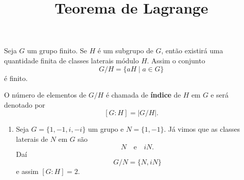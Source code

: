 \documentclass{beamer}
\title{Teorema de Lagrange}
\author[\autor]{\autor}
\institute[\instituto]{\instituto}
\date{}
\begin{document}
    \begin{frame}
        \maketitle
    \end{frame}


    \begin{frame}
        Seja $G$ um grupo finito. Se $H$ é um subgrupo de $G$, então existirá uma quantidade finita de classes laterais módulo $H$.
        Assim o conjunto
        \[
            G/H = \{aH \mid a \in G\}
        \]
        é finito.

        O número de elementos de $G/H$ é chamada de \textbf{índice} de $H$ em $G$ e será denotado por
        \[
            [G : H] = |G/H|.
        \]
    \end{frame}

    \begin{frame}
        \begin{exemplos}
            \begin{enumerate}[label=({\arabic*})]
                \item Seja $G = \{1, -1, i, -i\}$ um grupo \pause e $N = \{1, -1\}$. Já vimos que as classes laterais de $N$ em $G$ são
                \[
                    N \quad \mbox{e}\quad iN.
                \]
                Daí
                \[
                    G/N = \{N, iN\}
                \]
                e assim $[G : H] = 2$.

                \seti
            \end{enumerate}
        \end{exemplos}
    \end{frame}
    
\end{document}
